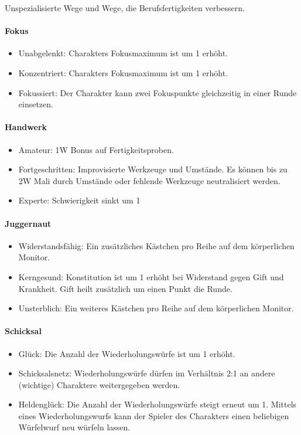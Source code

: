 \documentclass{article}
\begin{document}
Unspezialisierte Wege und Wege, die Berufsfertigkeiten verbessern.

\paragraph{Fokus}

\begin{itemize}
\item Unabgelenkt: Charakters Fokusmaximum ist um 1 erhöht.
\item Konzentriert: Charakters Fokusmaximum ist um 1 erhöht.
\item Fokussiert: Der Charakter kann zwei Fokuspunkte gleichzeitig in einer Runde einsetzen.
\end{itemize}

\paragraph{Handwerk}

\begin{itemize}
\item Amateur: 1W Bonus auf Fertigkeitsproben.
\item Fortgeschritten: Improvisierte Werkzeuge und Umstände. Es können bis zu 2W Mali durch Umstände oder fehlende Werkzeuge neutralisiert werden.
\item Experte: Schwierigkeit sinkt um 1
\end{itemize}

\paragraph{Juggernaut}

\begin{itemize}
\item Widerstandsfähig: Ein zusätzliches Kästchen pro Reihe auf dem körperlichen Monitor.
\item Kerngesund: Konstitution ist um 1 erhöht bei Widerstand gegen Gift und Krankheit. Gift heilt zusätzlich um einen Punkt die Runde.
\item Unsterblich: Ein weiteres Kästchen pro Reihe auf dem körperlichen Monitor.
\end{itemize}

\paragraph{Schicksal}

\begin{itemize}
\item Glück: Die Anzahl der Wiederholungswürfe ist um 1 erhöht.
\item Schicksalsnetz: Wiederholungswürfe dürfen im Verhältnis 2:1 an andere (wichtige) Charaktere weitergegeben werden.
\item Heldenglück: Die Anzahl der Wiederholungswürfe steigt erneut um 1. Mittels eines Wiederholungswurfs kann der Spieler des Charakters einen beliebigen Würfelwurf neu würfeln lassen.
\end{itemize}
\end{document}
